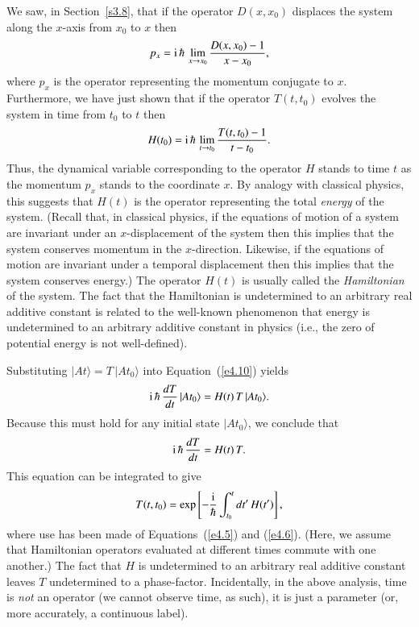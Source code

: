 We saw, in Section~\ref{s3.8}, that
if the operator $D(x, x_0)$ displaces the system along the $x$-axis from $x_0$ to $x$
then
\begin{equation}
p_x = {\rm i}\,\hbar\,\lim_{x\rightarrow x_0} \frac{D(x,x_0)-1}{x-x_0},
\end{equation}
where $p_x$ is the operator representing the momentum conjugate to $x$. Furthermore, we have
just shown that if the operator $T(t, t_0)$ evolves the system in time from $t_0$ to $t$
then
\begin{equation}
H(t_0) = {\rm i}\,\hbar\,\lim_{t\rightarrow t_0} \frac{T(t, t_0)-1}{t-t_0}.
\end{equation}
Thus, the 
dynamical variable corresponding to
the operator $H$ stands  to time $t$ as the momentum $p_x$ stands  to the
coordinate $x$. By analogy
with classical physics, this suggests that $H(t)$ is the operator representing
the total {\em energy}\/ of the system. (Recall that, in classical physics,
if the equations of motion of a system are invariant under an $x$-displacement
of the system then this implies that the system conserves momentum in the
$x$-direction. Likewise, if the equations of motion are invariant under
a temporal displacement then this implies that the system conserves energy.)
The operator $H(t)$ is usually called the {\em Hamiltonian}\/ of the system. 
The fact that the Hamiltonian is undetermined to an arbitrary real additive
constant is related to the well-known phenomenon that  energy is
undetermined to an arbitrary additive constant in physics ({\rm i.e.}, the zero
of potential energy is not well-defined). 

Substituting $|At\rangle = T\, |At_0\rangle$ into Equation~(\ref{e4.10}) yields
\begin{equation}
{\rm i}\,\hbar \,\frac{d T}{dt}\,|At_0\rangle = H(t)\,T\,|At_0\rangle.
\end{equation}
Because this must hold for any initial state $|At_0\rangle$, we conclude that
\begin{equation}\label{e4.14}
{\rm i} \,\hbar\, \frac{dT}{dt} = H(t) \,T.
\end{equation}
This  equation can be integrated to give
\begin{equation}\label{e4.15}
T(t, t_0) = \exp\left[-\frac{{\rm i}}{\hbar} \int_{t_0}^t dt'\,H(t') \right],
\end{equation}
where use has been made of Equations~(\ref{e4.5}) and (\ref{e4.6}). 
(Here, we assume that Hamiltonian operators
evaluated at  different times commute with one another.) The fact that $H$ is undetermined to an arbitrary real additive constant leaves
$T$ undetermined to a phase-factor. Incidentally, in the above
analysis,  time is {\em not}\/ an
operator (we cannot observe time, as such), it is just a parameter (or, more 
accurately, a continuous label). 

